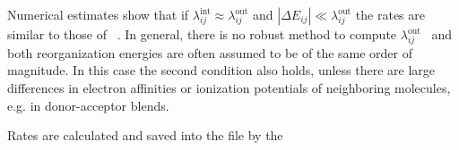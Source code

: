 Numerical estimates show that if  $\lambda_{ij}^\text{int} \approx \lambda_{ij}^\text{out}$ and $|\Delta E_{ij}| \ll \lambda_{ij}^\text{out}$ the rates are similar to those of ~. In general, there is no robust method to compute $\lambda_{ij}^\text{out}$~\cite{hoffman_reorganization_1996} and  both reorganization energies are often assumed to be of the same order of magnitude. In this case the second condition also holds, unless there are large differences in electron affinities or ionization potentials of neighboring molecules, e.g. in donor-acceptor blends.

Rates are calculated and saved into the \sqlstate file by the  \calculator

{\noindent \small \ctprun \opt \xmloptions \sql  \sqlstate \exe  {} }
\vskip 0.2cm
